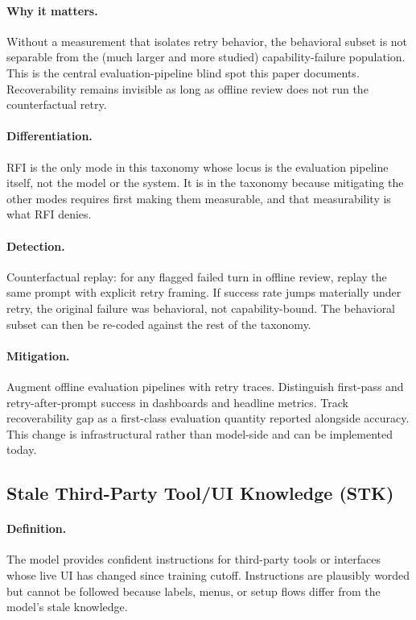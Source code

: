 \documentclass[11pt]{article}
\begin{document}
\paragraph{Why it matters.} Without a measurement that isolates retry behavior, the behavioral subset is not separable from the (much larger and more studied) capability-failure population. This is the central evaluation-pipeline blind spot this paper documents. Recoverability remains invisible as long as offline review does not run the counterfactual retry.

\paragraph{Differentiation.} RFI is the only mode in this taxonomy whose locus is the evaluation pipeline itself, not the model or the system. It is in the taxonomy because mitigating the other modes requires first making them measurable, and that measurability is what RFI denies.

\paragraph{Detection.} Counterfactual replay: for any flagged failed turn in offline review, replay the same prompt with explicit retry framing. If success rate jumps materially under retry, the original failure was behavioral, not capability-bound. The behavioral subset can then be re-coded against the rest of the taxonomy.

\paragraph{Mitigation.} Augment offline evaluation pipelines with retry traces. Distinguish first-pass and retry-after-prompt success in dashboards and headline metrics. Track recoverability gap as a first-class evaluation quantity reported alongside accuracy. This change is infrastructural rather than model-side and can be implemented today.

\subsection{Stale Third-Party Tool/UI Knowledge (STK)}
\paragraph{Definition.} The model provides confident instructions for third-party tools or interfaces whose live UI has changed since training cutoff. Instructions are plausibly worded but cannot be followed because labels, menus, or setup flows differ from the model's stale knowledge.
\end{document}
